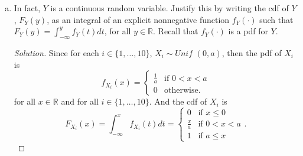 \documentclass[12pt]{article}
\newenvironment{solution}
{\renewcommand\qedsymbol{$\blacksquare$}\begin{proof}[Solution]}
{\end{proof}}
\begin{document}
\begin{enumerate}
\begin{enumerate}[(a)]
\begin{proof}
\begin{align*}
                            &\in\mathcal{F},
                        \end{align*}
                        as the intersection of a sequence of elements of
                        $\mathcal{F}$, and this follows from the properties of
                        $\sigma$-algebras in which $\mathcal{F}$ is one on
                        $\Omega$. Therefore, for all $x\in\mathbb{R}$,
                        $Y^{-1}((-\infty, x])=\{\omega\in\Omega:Y(\omega)\leq
                        x\}\in\mathcal{F}$ and so $Y$ is an
                        $\mathcal{F}$-measurable function and thus $Y$ is a random
                        variable on $(\Omega, \mathcal{F})$. 
                    \end{proof}
                \item In fact, $Y$ is a continuous random variable. Justify
                    this by writing the cdf of $Y$, $F_Y(y)$, as an integral of
                    an explicit nonnegative function $f_Y(\cdot)$ such that
                    $F_Y(y)=\int_{-\infty}^{y}f_Y(t)dt$, for all
                    $y\in\mathbb{R}$. Recall that $f_Y(\cdot)$ is a pdf for
                    $Y$.
                    \begin{solution}
                        Since for each $i\in\{1, \dots, 10\}$,
                        $X_i\sim\textit{Unif }(0,
                        a)$, then the pdf of $X_i$ is 
                        \begin{equation*}
                            f_{X_i}(x)=\begin{cases}
                                \frac{1}{a} &\text{if $0<x<a$} \\
                                0 &\text{otherwise}.
                            \end{cases}
                        \end{equation*}
                        for all $x\in\mathbb{R}$ and for all $i\in\{1, \dots,
                        10\}$. And the cdf of $X_i$ is
                        \begin{equation*}
                            F_{X_i}(x)=\int_{-\infty}^{x}f_{X_i}(t)dt=\begin{cases}
                                0 &\text{if $x\leq 0$} \\
                                \frac{x}{a} &\text{if $0<x<a$} \\
                                1 &\text{if $a\leq x$}
                            \end{cases}.

\end{equation*}
\end{solution}
\end{enumerate}
\end{enumerate}
\end{document}
